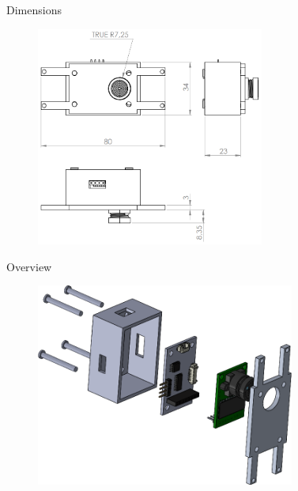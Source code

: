 \begin{frame}{Dimensions}

    \begin{figure}[!ht]
        \begin{center}
            \includegraphics[width=7.5cm]{figures/slcam-drawing.png}
        \end{center}
    \end{figure}

\end{frame}


\begin{frame}{Overview}

    \begin{figure}[!ht]
        \begin{center}
            \includegraphics[width=8.5cm]{figures/slcam-exp.png}
        \end{center}
    \end{figure}

\end{frame}

